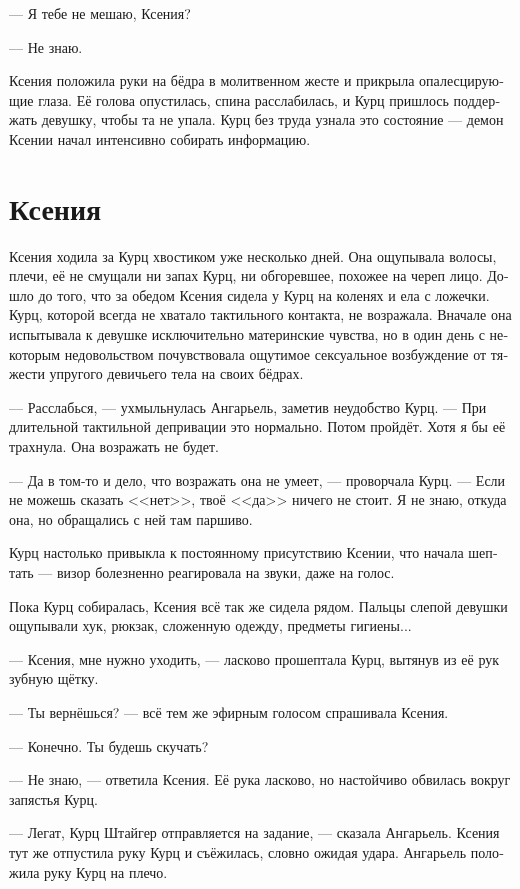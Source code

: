 \documentclass[a4paper,12pt,fleqn]{book}\usepackage{cooltooltips}\usepackage{polyglossia}\setdefaultlanguage[babelshorthands=true]{russian}\setotherlanguage{english}\defaultfontfeatures{Ligatures=TeX,Mapping=tex-text} \usepackage{xcolor}\definecolor{lightgray}{HTML}{bbbbbb}\color{lightgray}\newcommand{\ml}[3]{\textenglish{\textcolor{black}{#3}}}
\begin{document}
--- Я тебе не мешаю, Ксения?

--- Не знаю.

Ксения положила руки на бёдра в молитвенном жесте и прикрыла опалесцирующие глаза.
Её голова опустилась, спина расслабилась, и Курц пришлось поддержать девушку, чтобы та не упала.
Курц без труда узнала это состояние --- демон Ксении начал интенсивно собирать информацию.

\section{Ксения}

Ксения ходила за Курц хвостиком уже несколько дней.
Она ощупывала волосы, плечи, её не смущали ни запах Курц, ни обгоревшее, похожее на череп лицо.
Дошло до того, что за обедом Ксения сидела у Курц на коленях и ела с ложечки.
Курц, которой всегда не хватало тактильного контакта, не возражала.
Вначале она испытывала к девушке исключительно материнские чувства, но в один день с некоторым недовольством почувствовала ощутимое сексуальное возбуждение от тяжести упругого девичьего тела на своих бёдрах.

--- Расслабься, --- ухмыльнулась Ангарьель, заметив неудобство Курц.
--- При длительной тактильной депривации это нормально.
Потом пройдёт.
Хотя я бы её трахнула.
Она возражать не будет.

--- Да в том-то и дело, что возражать она не умеет, --- проворчала Курц.
--- Если не можешь сказать <<нет>>, твоё <<да>> ничего не стоит.
Я не знаю, откуда она, но обращались с ней там паршиво.

Курц настолько привыкла к постоянному присутствию Ксении, что начала шептать --- визор болезненно реагировала на звуки, даже на голос.

Пока Курц собиралась, Ксения всё так же сидела рядом.
Пальцы слепой девушки ощупывали хук, рюкзак, сложенную одежду, предметы гигиены...

--- Ксения, мне нужно уходить, --- ласково прошептала Курц, вытянув из её рук зубную щётку.

--- Ты вернёшься? --- всё тем же эфирным голосом спрашивала Ксения.

--- Конечно.
Ты будешь скучать?

--- Не знаю, --- ответила Ксения.
Её рука ласково, но настойчиво обвилась вокруг запястья Курц.

--- Легат, Курц Штайгер отправляется на задание, --- сказала Ангарьель.
Ксения тут же отпустила руку Курц и съёжилась, словно ожидая удара.
Ангарьель положила руку Курц на плечо.
\end{document}
